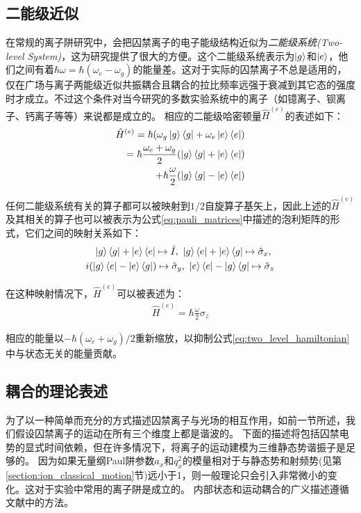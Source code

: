 \subsection[二能级近似]{二能级近似\label{section:two_level_approximation}}
在常规的离子阱研究中，会把囚禁离子的电子能级结构近似为\emph{二能级系统(Two-level System)}，这为研究提供了很大的方便。这个二能级系统表示为$\ket{g}$和$\ket{e}$，他们之间有着$\hbar \omega=\hbar(\omega_e-\omega_g)$的能量差。这对于实际的囚禁离子不总是适用的，仅在广场与离子两能级近似共振耦合且耦合的拉比频率远强于衰减到其它态的强度时才成立。不过这个条件对当今研究的多数实验系统中的离子（如镱离子、钡离子、钙离子等等）来说都是成立的。
相应的二能级哈密顿量$\hat{H}^{(e)}$的表述如下：
\begin{align}
    \hat{H}^{(e)}=\hbar(\omega_g\ket{g}\bra{g}+\omega_e\ket{e}\bra{e})\\
    =\hbar\frac{\omega_e+\omega_g}{2}(\ket{g}\bra{g}+\ket{e}\bra{e})\\
    +\hbar\frac{\omega}{2}(\ket{g}\bra{g}-\ket{e}\bra{e}) \label{eq:two_level_hamiltonian}
\end{align}

任何二能级系统有关的算子都可以被映射到$1/2$自旋算子基矢上，因此上述的$\hat{H}^{(e)}$及其相关的算子也可以被表示为公式\eqref{eq:pauli_matrices}中描述的泡利矩阵的形式，它们之间的映射关系如下：
\begin{align}
    \ket{g}\bra{g}+\ket{e}\bra{e}\mapsto \hat{I},\ \ket{g}\bra{e}+\ket{e}\bra{g}\mapsto \hat{\sigma}_x,\ \\
    i(\ket{g}\bra{e}-\ket{e}\bra{g})\mapsto \hat{\sigma}_y,\ \ket{e}\bra{e}-\ket{g}\bra{g}\mapsto \hat{\sigma}_z
\end{align}

在这种映射情况下，$\hat{H}^{(e)}$可以被表述为：
\begin{align}
    \hat{H}^{(e)}=\hbar\frac{\omega}{2}\sigma_z
\end{align}

相应的能量以$-\hbar(\omega_e+\omega_g)/2$重新缩放，以抑制公式\eqref{eq:two_level_hamiltonian}中与状态无关的能量贡献。

\subsection[耦合的理论表述]{耦合的理论表述}

为了以一种简单而充分的方式描述囚禁离子与光场的相互作用，如前一节所述，我们假设囚禁离子的运动在所有三个维度上都是谐波的。
下面的描述将包括囚禁电势的显式时间依赖，但在许多情况下，将离子的运动建模为三维静态势谐振子是足够的。
因为如果无量纲Paul阱参数$a_x$和$q_x^2$的模量相对于与静态势和射频势(见第\ref{section:ion_classical_motion}节)远小于1，则一般理论只会引入非常微小的变化。这对于实验中常用的离子阱是成立的。
内部状态和运动耦合的广义描述遵循文献\cite[]{Cirac_Garay_Blatt_Parkins_Zoller_2002,1996Paul}中的方法。

